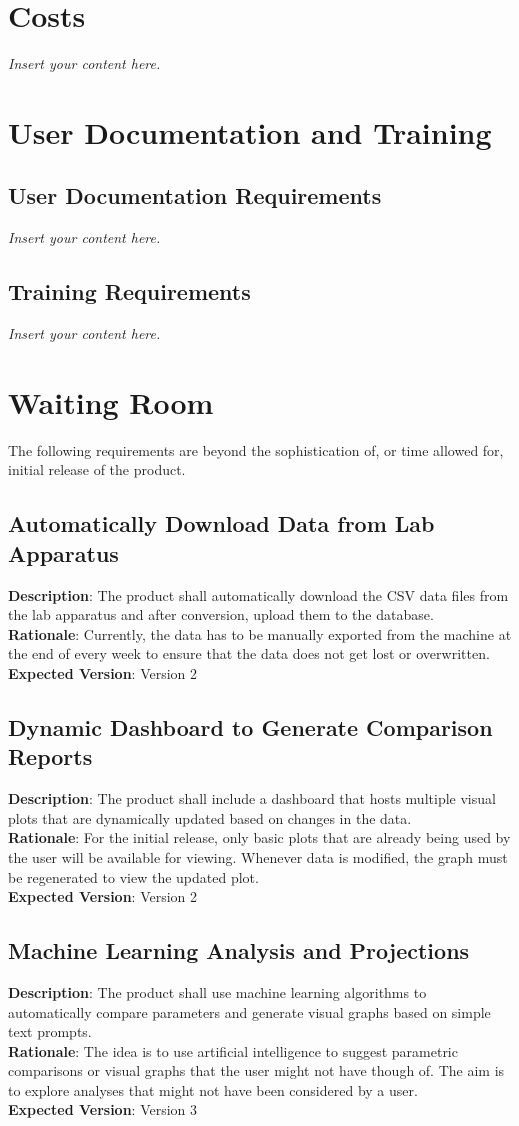 \documentclass[12pt]{article}
\newcommand{\lips}{\textit{Insert your content here.}}
\begin{document}
\section{Costs}
\lips
\section{User Documentation and Training}
\subsection{User Documentation Requirements}
\lips
\subsection{Training Requirements}
\lips

\section{Waiting Room}
The following requirements are beyond the sophistication of, or time allowed for, initial release of the product.
\subsection{Automatically Download Data from Lab Apparatus}
\textbf{Description}: The product shall automatically download the CSV data files from the lab apparatus and after conversion, upload them to the database.\\
\textbf{Rationale}: Currently, the data has to be manually exported from the machine at the end of every week to ensure that the data does not get lost or overwritten.\\
\textbf{Expected Version}: Version 2

\subsection{Dynamic Dashboard to Generate Comparison Reports}
\textbf{Description}: The product shall include a dashboard that hosts multiple visual plots that are dynamically updated based on changes in the data.\\
\textbf{Rationale}: For the initial release, only basic plots that are already being used by the user will be available for viewing. Whenever data is modified, the graph
must be regenerated to view the updated plot.\\
\textbf{Expected Version}: Version 2

\subsection{Machine Learning Analysis and Projections}
\textbf{Description}: The product shall use machine learning algorithms to automatically compare parameters and generate visual graphs based on simple text prompts.\\
\textbf{Rationale}: The idea is to use artificial intelligence to suggest parametric comparisons or visual graphs that the user might not have though of. The aim is to
explore analyses that might not have been considered by a user.\\
\textbf{Expected Version}: Version 3
\end{document}
